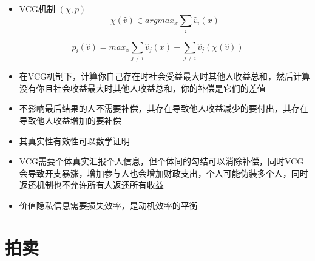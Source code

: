 \documentclass[
]{book}
\providecommand{\tightlist}{%
  \setlength{\itemsep}{0pt}\setlength{\parskip}{0pt}}
\begin{document}
\begin{itemize}
\tightlist
\item
  VCG机制 \((\chi,p)\)
  \[\chi (\hat v) \in arg max_x \sum_i \hat v_i(x)\]
\end{itemize}

\[p_i(\hat v) = max_x\sum_{j\neq i} \hat v_j(x) - \sum_{j\neq i} \hat v_j(\chi(\hat v))\]

\begin{itemize}
\tightlist
\item
  在VCG机制下，计算你自己存在时社会受益最大时其他人收益总和，然后计算没有你且社会收益最大时其他人收益总和，你的补偿是它们的差值
\item
  不影响最后结果的人不需要补偿，其存在导致他人收益减少的要付出，其存在导致他人收益增加的要补偿
\item
  其真实性有效性可以数学证明
\item
  VCG需要个体真实汇报个人信息，但个体间的勾结可以消除补偿，同时VCG会导致开支暴涨，增加参与人也会增加财政支出，个人可能伪装多个人，同时返还机制也不允许所有人返还所有收益
\item
  价值隐私信息需要损失效率，是动机效率的平衡
\end{itemize}

\hypertarget{ux62cdux5356}{%
\section{拍卖}\label{ux62cdux5356}}
\end{document}
